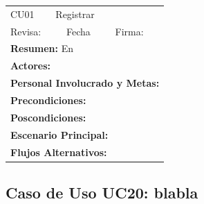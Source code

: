 \begin{longtable}{|l|p{5.5cm}|l|p{2cm}|l|p{1.9cm}|} \hline
    \cellcolor{grisOscuro} CU01 & \multicolumn{4}{|l|}{  \cellcolor{grisOscuro} Registrar} &  \cellcolor{grisClaro}\multirow{2}{1cm}{} \\ \cline{1-5}
    \cellcolor{grisOscuro} Revisa: &  \cellcolor{grisClaro} &  \cellcolor{grisOscuro} Fecha &  \cellcolor{grisClaro} &  \cellcolor{grisOscuro} Firma: & \cellcolor{grisClaro} \\ \hline
    \multicolumn{6}{|p{15cm}|}{ \textbf{Resumen: } En

    } \\ \hline

    \multicolumn{6}{|p{15cm}|}{ \textbf{Actores: }

    } \\ \hline

    \multicolumn{6}{|p{15cm}|}{ \textbf{Personal Involucrado y Metas: }

    } \\ \hline

    \multicolumn{6}{|p{15cm}|}{ \textbf{Precondiciones: }

    } \\ \hline

    \multicolumn{6}{|p{15cm}|}{ \textbf{Poscondiciones: }

    } \\ \hline

    \multicolumn{6}{|p{15cm}|}{ \textbf{Escenario Principal: }

    } \\ \hline

    \multicolumn{6}{|p{15cm}|}{ \textbf{Flujos Alternativos: }

    } \\ \hline

\end{longtable}


\subsection{Caso de Uso UC20: blabla}

